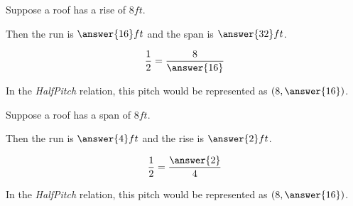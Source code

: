\documentclass{ximera}
\begin{document}
\begin{question}

Suppose a roof has a rise of $8 ft$.  

Then the run is $\answer{16} ft$ and the span is $\answer{32} ft$.

\[
\frac{1}{2} = \frac{8}{\answer{16}}
\]


In the \textit{HalfPitch} relation, this pitch would be represented as $\left( 8, \answer{16} \right)$.

\end{question}








\begin{question}

Suppose a roof has a span of $8 ft$.  

Then the run is $\answer{4} ft$ and the rise is $\answer{2} ft$.

\[
\frac{1}{2} = \frac{\answer{2}}{4}
\]


In the \textit{HalfPitch} relation, this pitch would be represented as $\left( 8, \answer{16} \right)$.

\end{question}







\end{document}
